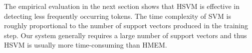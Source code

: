 The empirical evaluation in the next section shows that HSVM is
effective in detecting less frequently occurring tokens. The time
complexity of SVM is roughly proportional to the number of support
vectors produced in the training step. Our system generally requires a
large number of support vectors and thus HSVM is usually more
time-consuming than HMEM.
